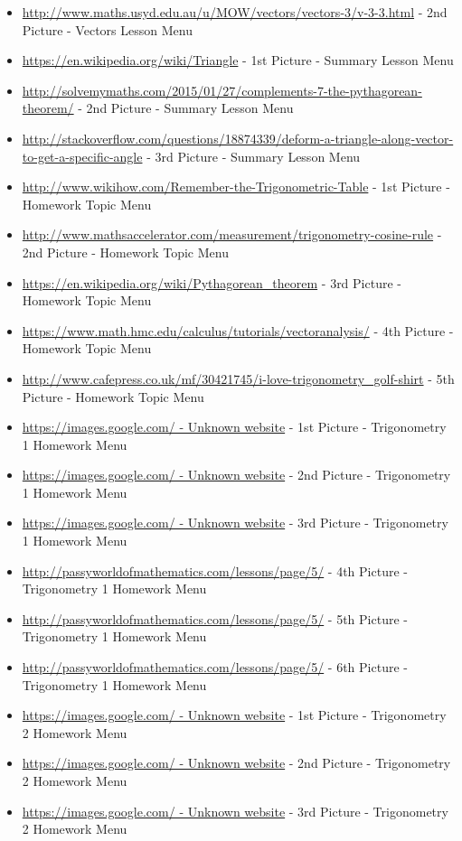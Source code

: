 \begin{itemize}
	\item \url{http://www.maths.usyd.edu.au/u/MOW/vectors/vectors-3/v-3-3.html} - 2nd Picture - Vectors Lesson Menu
	\item \url{https://en.wikipedia.org/wiki/Triangle} - 1st Picture - Summary Lesson Menu
	\item \url{http://solvemymaths.com/2015/01/27/complements-7-the-pythagorean-theorem/} - 2nd Picture - Summary Lesson Menu
	\item \url{http://stackoverflow.com/questions/18874339/deform-a-triangle-along-vector-to-get-a-specific-angle} - 3rd Picture - Summary Lesson Menu
	\item \url{http://www.wikihow.com/Remember-the-Trigonometric-Table} - 1st Picture - Homework Topic Menu
	\item \url{http://www.mathsaccelerator.com/measurement/trigonometry-cosine-rule} - 2nd Picture - Homework Topic Menu
	\item \url{https://en.wikipedia.org/wiki/Pythagorean_theorem} - 3rd Picture - Homework Topic Menu
	\item \url{https://www.math.hmc.edu/calculus/tutorials/vectoranalysis/} - 4th Picture - Homework Topic Menu
	\item \url{http://www.cafepress.co.uk/mf/30421745/i-love-trigonometry_golf-shirt} - 5th Picture - Homework Topic Menu
	\item \url{https://images.google.com/ - Unknown website} - 1st Picture - Trigonometry 1 Homework Menu
	\item \url{https://images.google.com/ - Unknown website} - 2nd Picture - Trigonometry 1 Homework Menu
	\item \url{https://images.google.com/ - Unknown website} - 3rd Picture - Trigonometry 1 Homework Menu
	\item \url{http://passyworldofmathematics.com/lessons/page/5/} - 4th Picture - Trigonometry 1 Homework Menu
	\item \url{http://passyworldofmathematics.com/lessons/page/5/} - 5th Picture - Trigonometry 1 Homework Menu
	\item \url{http://passyworldofmathematics.com/lessons/page/5/} - 6th Picture - Trigonometry 1 Homework Menu
	\item \url{https://images.google.com/ - Unknown website} - 1st Picture - Trigonometry 2 Homework Menu
	\item \url{https://images.google.com/ - Unknown website} - 2nd Picture - Trigonometry 2 Homework Menu
	\item \url{https://images.google.com/ - Unknown website} - 3rd Picture - Trigonometry 2 Homework Menu

\end{itemize}
